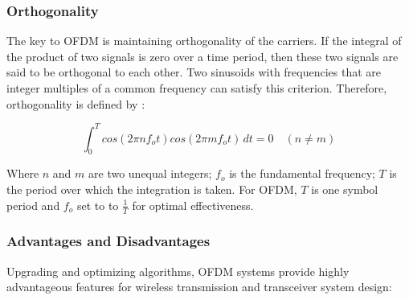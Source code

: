 \subsubsection{Orthogonality}

The key to OFDM is maintaining orthogonality of the carriers. If the integral of the product of two signals is zero over a time period, then these two signals are said to be orthogonal to each other. Two sinusoids with frequencies that are integer multiples of a common frequency can satisfy this criterion. Therefore, orthogonality is defined by :

\begin{equation}\label{eq1}
    \int_{0}^{T} cos(2 \pi n f_o t) cos(2 \pi m f_o t) \,dt = 0 \quad (n \neq m) 
\end{equation}

Where $n$ and $m$ are two unequal integers; $f_o$ is the fundamental frequency; $T$ is the period over which the integration is taken. For OFDM, $T$ is one symbol period and $f_o$ set to to $\frac{1}{T}$ for optimal effectiveness.

\subsubsection{Advantages and Disadvantages}

Upgrading and optimizing algorithms, OFDM systems provide highly advantageous features for wireless transmission and transceiver system design:

